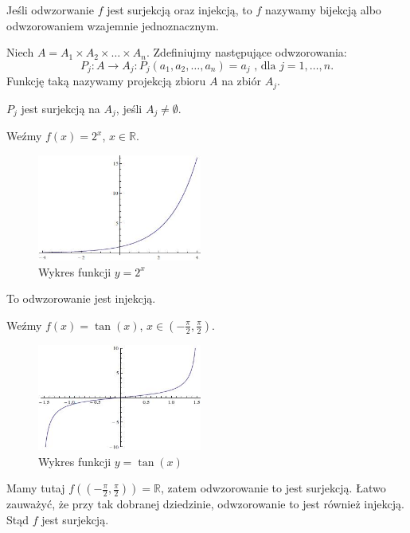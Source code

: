 \begin{definicja}%
Jeśli odwzorwanie $f$ jest surjekcją oraz injekcją, to $f$ nazywamy bijekcją albo odwzorowaniem wzajemnie jednoznacznym.
\end{definicja}

\begin{przyklad}
Niech $A = A_1 \times A_2 \times \dots \times A_n $.
Zdefiniujmy następujące odwzorowania:
$$P_j : A \rightarrow A_j : P_j(a_1,a_2, \dots ,a_n)=a_j \text{ , dla  } j = 1, \dots ,n .$$
Funkcję taką nazywamy projekcją zbioru $A$ na zbiór $A_j$.

$P_j$ jest surjekcją na $A_j$, jeśli $A_j \neq \emptyset$. 
 
\end{przyklad}

\begin{przyklad}
Weźmy $f(x) = 2^x$, $x \in \mathbb{R}$.
\begin{figure}[H]
  \begin{center}
    \includegraphics[width=0.48\textwidth]{./podrozdzial01-obrazki/1.jpeg}
  \end{center}
  \caption{Wykres funkcji $y=2^x$}
\end{figure}
To odwzorowanie jest injekcją.

\end{przyklad}

\begin{przyklad}
Weźmy $f(x) = \tan(x)$, $x \in (-\frac{\pi}{2},\frac{\pi}{2})$.
\begin{figure}[H]%
  \begin{center}
    \includegraphics[width=0.48\textwidth]{./podrozdzial01-obrazki/2.jpeg}
  \end{center}
  \caption{Wykres funkcji $y=\tan(x)$}
\end{figure}
Mamy tutaj $f((-\frac{\pi}{2},\frac{\pi}{2})) = \mathbb{R} $, zatem odwzorowanie to jest surjekcją.
Łatwo zauważyć, że przy tak dobranej dziedzinie, odwzorowanie to jest również injekcją. 
Stąd $f$ jest surjekcją.

\end{przyklad}

